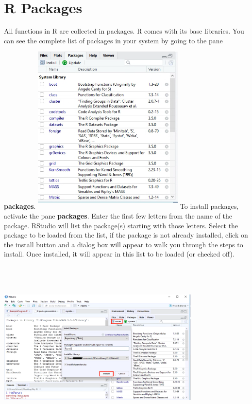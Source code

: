 \documentclass[a4paper]{report}
\begin{document}
    \newpage  \section{R Packages}
        \begin{flushleft}
        
        All functions in R are collected in packages. R comes with its base libraries. You can see the complete list of packages in your system by going to the pane \textbf{packages}. 
        \newline \newline 
                    \includegraphics[width=3in,height = 3.5in]{images/PCK1.png}
      \newline  
        To install packages, activate the pane \textbf{packages}. Enter the first few letters from the name of the package. RStudio will list the package(s) starting with those letters. Select the package to be loaded from the list, if the package is not already installed, click on the install button and a dialog box will appear to walk you through the steps to install. Once installed, it will appear in this list to be loaded (or checked off).
        
                    \includegraphics[width=4in,height=3.5in]{images/PCK2.png}


\end{flushleft}
\end{document}
